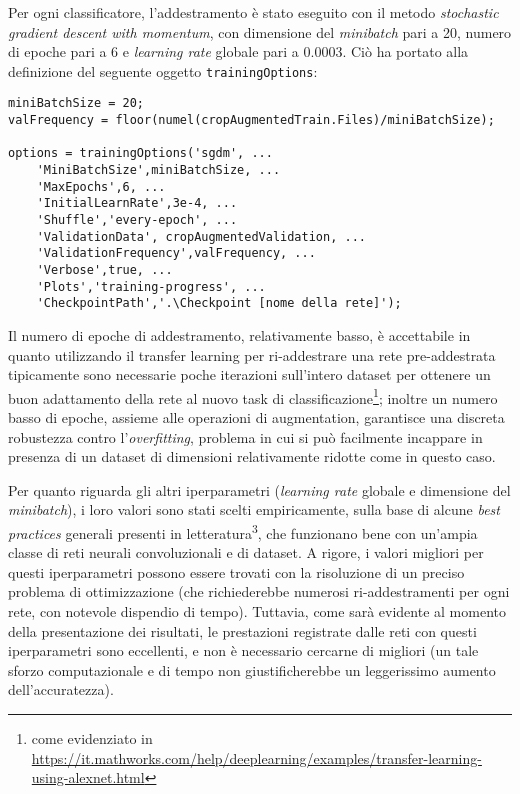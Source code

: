 Per ogni classificatore, l’addestramento è stato eseguito con il metodo \textit{stochastic gradient descent with momentum}, con dimensione del \textit{minibatch} pari a 20, numero di epoche pari a 6 e \textit{learning rate} globale pari a 0.0003.
Ciò ha portato alla definizione del seguente oggetto \verb|trainingOptions|:

\begin{verbatim}
miniBatchSize = 20;
valFrequency = floor(numel(cropAugmentedTrain.Files)/miniBatchSize);

options = trainingOptions('sgdm', ...
    'MiniBatchSize',miniBatchSize, ...
    'MaxEpochs',6, ...
    'InitialLearnRate',3e-4, ...
    'Shuffle','every-epoch', ...
    'ValidationData', cropAugmentedValidation, ...
    'ValidationFrequency',valFrequency, ...
    'Verbose',true, ...
    'Plots','training-progress', ...
    'CheckpointPath','.\Checkpoint [nome della rete]');
\end{verbatim}

Il numero di epoche di addestramento, relativamente basso, è accettabile in quanto utilizzando il transfer learning per ri-addestrare una rete pre-addestrata tipicamente sono necessarie poche iterazioni sull'intero dataset per ottenere un buon adattamento della rete al nuovo task di classificazione\footnote{come evidenziato in \url{https://it.mathworks.com/help/deeplearning/examples/transfer-learning-using-alexnet.html}}; inoltre un numero basso di epoche, assieme alle operazioni di augmentation, garantisce una discreta robustezza contro l'\textit{overfitting}, problema in cui si può facilmente incappare in presenza di un dataset di dimensioni relativamente ridotte come in questo caso.

Per quanto riguarda gli altri iperparametri (\textit{learning rate} globale e dimensione del \textit{minibatch}), i loro valori sono stati scelti empiricamente, sulla base di alcune \textit{best practices} generali presenti in letteratura\textsuperscript{3}, che funzionano bene con un'ampia classe di reti neurali convoluzionali e di dataset.
A rigore, i valori migliori per questi iperparametri possono essere trovati con la risoluzione di un preciso problema di ottimizzazione (che richiederebbe numerosi ri-addestramenti per ogni rete, con notevole dispendio di tempo). Tuttavia, come sarà evidente al momento della presentazione dei risultati, le prestazioni registrate dalle reti con questi iperparametri sono eccellenti, e non è necessario cercarne di migliori (un tale sforzo computazionale e di tempo non giustificherebbe un leggerissimo aumento dell'accuratezza).\\

